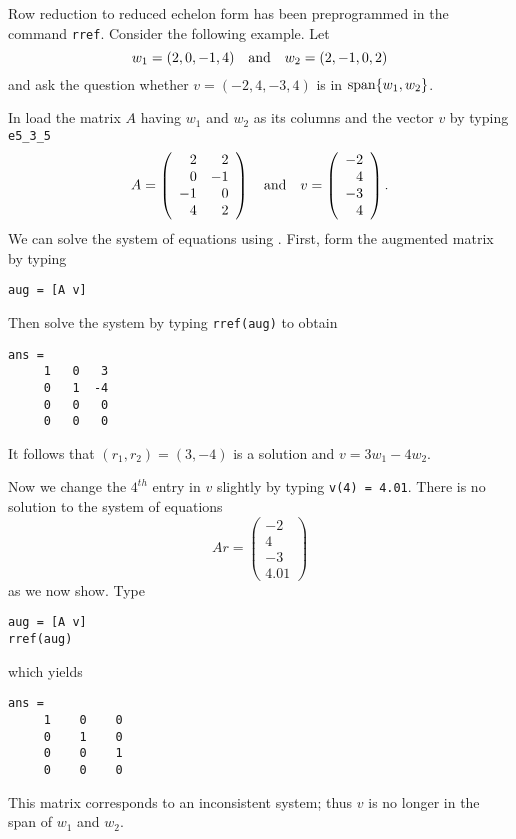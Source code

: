 Row reduction to reduced echelon form
has been preprogrammed in the
\Matlab command {\tt rref}.   Consider the
following example.  Let
\begin{equation}  \label{e:w1w2}
     w_1=(2,0,-1,4) \quad\mbox{and}\quad w_2=(2,-1,0,2)
\end{equation}
and ask the question whether $v=(-2,4,-3,4)$ is in ${\rm span}\{w_1,w_2\}$.

In \Matlab load the matrix $A$ having $w_1$ and
$w_2$ as its columns and the vector $v$ by typing {\tt e5\_3\_5}
\begin{equation*}  \label{e:Aandv}
A=\left(\begin{array}{rr} 2 & 2 \\ 0 & -1 \\ -1 & 0 \\ 4 & 2
\end{array}\right) \quad\mbox{and}\quad
v=\left(\begin{array}{r} -2 \\ 4 \\ -3 \\ 4 \end{array}\right).
\end{equation*}%
We can solve the system of equations using \Matlabp.
First, form the augmented matrix by typing
\begin{verbatim}
aug = [A v]
\end{verbatim}
Then solve the system by typing {\tt rref(aug)} to obtain
\begin{verbatim}
ans =
     1   0   3
     0   1  -4
     0   0   0
     0   0   0
\end{verbatim}
It follows that $(r_1,r_2)=(3,-4)$ is a solution and $v=3w_1-4w_2$.

Now we change the $4^{th}$ entry in $v$ slightly by typing
{\tt v(4) = 4.01}.  There is no solution to the system of equations
\[
Ar = \left(\begin{array}{r} -2 \\ 4 \\ -3 \\ 4.01
\end{array}\right)
\]
as we now show.  Type
\begin{verbatim}
aug = [A v]
rref(aug)
\end{verbatim}
which yields
\begin{verbatim}
ans =
     1    0    0
     0    1    0
     0    0    1
     0    0    0
\end{verbatim}
This matrix corresponds to an inconsistent system;
thus $v$ is no longer in the span of $w_1$ and $w_2$.

